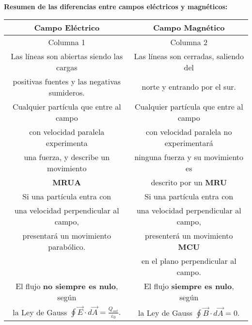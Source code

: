 \documentclass[a4paper,12pt]{article} %
\begin{document}
\newpage

\begin{justify}
    \textbf{Resumen de las diferencias entre campos eléctricos y magnéticos:}
\end{justify}

\vspace{\baselineskip}

\begin{longtable}{|c|c|}
    
    \hline
    \textbf{Campo Eléctrico} &  \textbf{Campo Magnético} \\ \hline
    \endfirsthead \hline

    Columna 1 & Columna 2\\ \hline
    \endhead

    Las líneas son abiertas siendo las cargas & Las líneas son cerradas, saliendo del  \\

    positivas fuentes y las negativas sumideros. & norte y entrando por el sur. \\ \hline

    Cualquier partícula que entre al campo & Cualquier partícula que entre al campo\\

    con velocidad paralela experimenta & con velocidad paralela no experimentará \\

    una fuerza, y describe un movimiento & ninguna fuerza y su movimiento es \\ 

    \textbf{MRUA} &  descrito por un \textbf{MRU} \\ \hline

    Si una partícula entra con  & Si una partícula entra con \\

    una velocidad perpendicular al campo, & una velocidad perpendicular al campo, \\

    presentará un movimiento parabólico. &  presenterá un movimiento \textbf{MCU} \\ 

    \; & en el plano perpendicular al campo. \\ \hline 

    El flujo \textbf{no siempre es nulo}, según & El flujo \textbf{siempre es nulo}, según \\

    la Ley de Gauss \(\oint \vec{E} \cdot d\vec{A}= \frac{Q_{int}}{\varepsilon_0}.\) & la Ley de Gauss \(\oint \vec{B} \cdot d \vec{A} = 0\). \\ \hline


\end{longtable}
\end{document}
